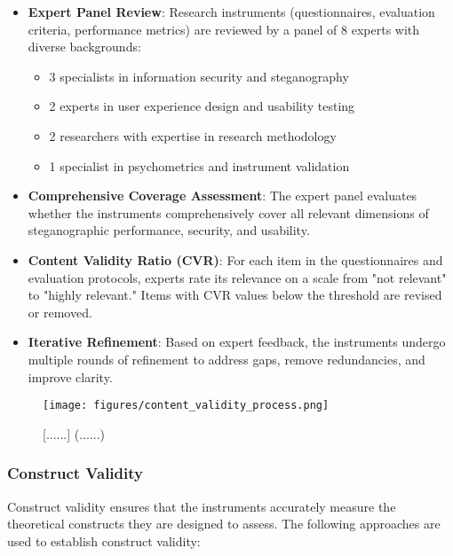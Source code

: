 \documentclass[12pt, a4paper, oneside]{book}
\begin{document}
\begin{itemize}[leftmargin=*]
    \item \textbf{Expert Panel Review}: Research instruments (questionnaires, evaluation criteria, performance metrics) are reviewed by a panel of 8 experts with diverse backgrounds:
    \begin{itemize}
        \item 3 specialists in information security and steganography
        \item 2 experts in user experience design and usability testing
        \item 2 researchers with expertise in research methodology
        \item 1 specialist in psychometrics and instrument validation
    \end{itemize}

    \item \textbf{Comprehensive Coverage Assessment}: The expert panel evaluates whether the instruments comprehensively cover all relevant dimensions of steganographic performance, security, and usability.

    \item \textbf{Content Validity Ratio (CVR)}: For each item in the questionnaires and evaluation protocols, experts rate its relevance on a scale from "not relevant" to "highly relevant." Items with CVR values below the threshold are revised or removed.

    \item \textbf{Iterative Refinement}: Based on expert feedback, the instruments undergo multiple rounds of refinement to address gaps, remove redundancies, and improve clarity.
\end{itemize}

\begin{figure}[htbp]
    \centering
    \texttt{[image: figures/content\_validity\_process.png]}
    \caption{[......] (......)}
    \label{fig:content_validity}
\end{figure}

\subsubsection{Construct Validity}
Construct validity ensures that the instruments accurately measure the theoretical constructs they are designed to assess. The following approaches are used to establish construct validity:
\end{document}
